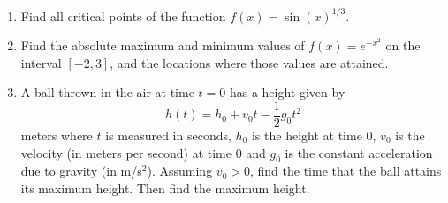 \documentclass[11pt,fleqn]{article}
\begin{document}
\setlength{\parindent}{0cm}
\renewcommand{\headrulewidth}{0pt}
\newcommand{\blank}[1]{\rule{#1}{0.75pt}}
\renewcommand{\d}{\displaystyle}
\vspace*{-0.7in}
\begin{center}
 {\large{ }}
\end{center}

\begin{enumerate}
\item Find all critical points of the function $f(x)=\sin(x)^{1/3}$.
\vfill
\item Find the absolute maximum and minimum values of 
$f(x)=e^{-x^2}$ on the interval $[-2,3]$, and the locations
where those values are attained.
\vfill
\newpage
\item A ball thrown in the air at time $t=0$ has a height given by 
\[
h(t) = h_0 + v_0 t - \frac{1}{2}g_0 t^2
\]
meters where $t$ is measured in seconds, $h_0$ is the height at time $0$,
$v_0$ is the velocity (in meters per second) at time 0 and $g_0$
is the constant acceleration due to gravity (in m/s$^2$).  
Assuming $v_0>0$, find the time that the ball attains its maximum height.
Then find the maximum height.

\end{enumerate}
\end{document}
